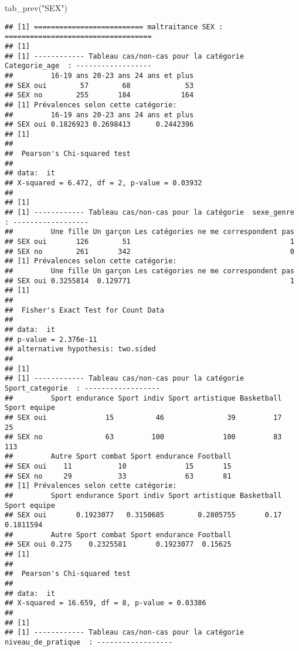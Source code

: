 \documentclass[
]{article}
\newenvironment{Shaded}{\begin{snugshade}}{\end{snugshade}}
\newcommand{\FunctionTok}[1]{\textcolor[rgb]{0.00,0.00,0.00}{#1}}
\newcommand{\NormalTok}[1]{#1}
\newcommand{\StringTok}[1]{\textcolor[rgb]{0.31,0.60,0.02}{#1}}
\begin{document}
\begin{Shaded}
\begin{Highlighting}[]
\FunctionTok{tab\_prev}\NormalTok{(}\StringTok{"SEX"}\NormalTok{)}
\end{Highlighting}
\end{Shaded}

\begin{verbatim}
## [1] ========================== maltraitance SEX : ===================================
## [1] 
## [1] ------------ Tableau cas/non-cas pour la catégorie  Categorie_age  : ------------------
##         16-19 ans 20-23 ans 24 ans et plus
## SEX oui        57        68             53
## SEX no        255       184            164
## [1] Prévalences selon cette catégorie:
##         16-19 ans 20-23 ans 24 ans et plus
## SEX oui 0.1826923 0.2698413      0.2442396
## [1] 
## 
##  Pearson's Chi-squared test
## 
## data:  it
## X-squared = 6.472, df = 2, p-value = 0.03932
## 
## [1] 
## [1] ------------ Tableau cas/non-cas pour la catégorie  sexe_genre  : ------------------
##         Une fille Un garçon Les catégories ne me correspondent pas
## SEX oui       126        51                                      1
## SEX no        261       342                                      0
## [1] Prévalences selon cette catégorie:
##         Une fille Un garçon Les catégories ne me correspondent pas
## SEX oui 0.3255814  0.129771                                      1
## [1] 
## 
##  Fisher's Exact Test for Count Data
## 
## data:  it
## p-value = 2.376e-11
## alternative hypothesis: two.sided
## 
## [1] 
## [1] ------------ Tableau cas/non-cas pour la catégorie  Sport_categorie  : ------------------
##         Sport endurance Sport indiv Sport artistique Basketball Sport equipe
## SEX oui              15          46               39         17           25
## SEX no               63         100              100         83          113
##         Autre Sport combat Sport endurance Football
## SEX oui    11           10              15       15
## SEX no     29           33              63       81
## [1] Prévalences selon cette catégorie:
##         Sport endurance Sport indiv Sport artistique Basketball Sport equipe
## SEX oui       0.1923077   0.3150685        0.2805755       0.17    0.1811594
##         Autre Sport combat Sport endurance Football
## SEX oui 0.275    0.2325581       0.1923077  0.15625
## [1] 
## 
##  Pearson's Chi-squared test
## 
## data:  it
## X-squared = 16.659, df = 8, p-value = 0.03386
## 
## [1] 
## [1] ------------ Tableau cas/non-cas pour la catégorie  niveau_de_pratique  : ------------------

\end{verbatim}
\end{document}
